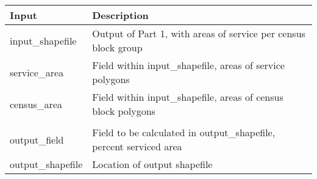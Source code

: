 \documentclass[11pt,]{article}
\begin{document}
\begin{longtable}[]{@{}ll@{}}
\toprule
\begin{minipage}[b]{0.19\columnwidth}\raggedright\strut
Input\strut
\end{minipage} & \begin{minipage}[b]{0.75\columnwidth}\raggedright\strut
Description\strut
\end{minipage}\tabularnewline
\midrule
\endhead
\begin{minipage}[t]{0.19\columnwidth}\raggedright\strut
input\_shapefile\strut
\end{minipage} & \begin{minipage}[t]{0.75\columnwidth}\raggedright\strut
Output of Part 1, with areas of service per census block group\strut
\end{minipage}\tabularnewline
\begin{minipage}[t]{0.19\columnwidth}\raggedright\strut
service\_area\strut
\end{minipage} & \begin{minipage}[t]{0.75\columnwidth}\raggedright\strut
Field within input\_shapefile, areas of service polygons\strut
\end{minipage}\tabularnewline
\begin{minipage}[t]{0.19\columnwidth}\raggedright\strut
census\_area\strut
\end{minipage} & \begin{minipage}[t]{0.75\columnwidth}\raggedright\strut
Field within input\_shapefile, areas of census block polygons\strut
\end{minipage}\tabularnewline
\begin{minipage}[t]{0.19\columnwidth}\raggedright\strut
\strut
\end{minipage}\tabularnewline
\begin{minipage}[t]{0.19\columnwidth}\raggedright\strut
output\_field\strut
\end{minipage} & \begin{minipage}[t]{0.75\columnwidth}\raggedright\strut
Field to be calculated in output\_shapefile, percent serviced area\strut
\end{minipage}\tabularnewline
\begin{minipage}[t]{0.19\columnwidth}\raggedright\strut
output\_shapefile\strut
\end{minipage} & \begin{minipage}[t]{0.75\columnwidth}\raggedright\strut
Location of output shapefile\strut
\end{minipage}\tabularnewline
\bottomrule
\end{longtable}
\end{document}
